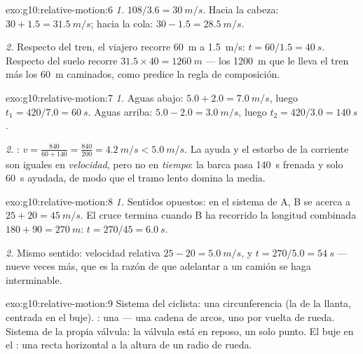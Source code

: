 \begin{solution}{exo:g10:relative-motion:6}
\emph{1.} $108/3.6 = \qty{30}{m/s}$. Hacia la cabeza:
$30 + 1.5 = \qty{31.5}{m/s}$; hacia la cola:
$30 - 1.5 = \qty{28.5}{m/s}$.

\emph{2.} Respecto del tren, el viajero recorre \qty{60}{m} a
\qty{1.5}{m/s}: $t = 60/1.5 = \qty{40}{s}$. Respecto del suelo recorre
$31.5 \times 40 = \qty{1260}{m}$ --- los \qty{1200}{m} que le lleva el
tren más los \qty{60}{m} caminados, como predice la regla de
composición.
\end{solution}

\begin{solution}{exo:g10:relative-motion:7}
\emph{1.} Aguas abajo: $5.0 + 2.0 = \qty{7.0}{m/s}$, luego
$t_1 = 420/7.0 = \qty{60}{s}$. Aguas arriba:
$5.0 - 2.0 = \qty{3.0}{m/s}$, luego $t_2 = 420/3.0 = \qty{140}{s}$.

\emph{2.} : $v = \frac{840}{60 + 140}
= \frac{840}{200} = \qty{4.2}{m/s} < \qty{5.0}{m/s}$. La ayuda y el
estorbo de la corriente son iguales en \emph{velocidad}, pero no en
\emph{tiempo}: la barca pasa \qty{140}{s} frenada y solo \qty{60}{s}
ayudada, de modo que el tramo lento domina la media.
\end{solution}

\begin{solution}{exo:g10:relative-motion:8}
\emph{1.} Sentidos opuestos: en el sistema de A, B se acerca a
$25 + 20 = \qty{45}{m/s}$. El cruce termina cuando B ha recorrido la
longitud combinada $180 + 90 = \qty{270}{m}$:
$t = 270/45 = \qty{6.0}{s}$.

\emph{2.} Mismo sentido: velocidad relativa
$25 - 20 = \qty{5.0}{m/s}$, y $t = 270/5.0 = \qty{54}{s}$ --- nueve
veces más, que es la razón de que adelantar a un camión se haga
interminable.
\end{solution}

\begin{solution}{exo:g10:relative-motion:9}
Sistema del ciclista: una circunferencia (la de la llanta, centrada en
el buje). : una  --- una cadena de arcos, uno
por vuelta de rueda. Sistema de la propia válvula: la válvula está en
reposo, un solo punto. El buje en el : una recta
horizontal a la altura de un radio de rueda.
\end{solution}

